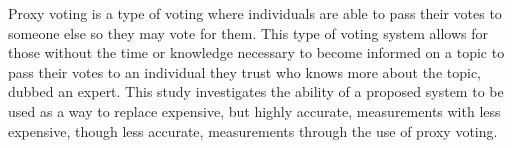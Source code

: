 %
%
%

\begin{publicabstract}

Proxy voting is a type of voting where individuals are able to pass their votes to
someone else so they may vote for them.
This type of voting system allows for those without the time or knowledge necessary
to become informed on a topic to pass their votes to an individual they trust who
knows more about the topic, dubbed an expert.
This study investigates the ability of a proposed system to be used as a way to
replace expensive, but highly accurate, measurements with less expensive,
though less accurate, measurements through the use of proxy voting.


\end{publicabstract}


